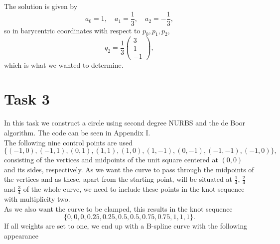 \documentclass[]{article}
\begin{document}
The solution is given by \begin{equation*}
a_0 = 1, \quad a_1 = \frac{1}{3}, \quad a_2 = -\frac{1}{3},
\end{equation*}
so in barycentric coordinates with respect to $p_0, p_1, p_2$, \begin{equation*}
q_2 = \frac{1}{3}\left(\begin{array}{r}
3\\
1\\
-1
\end{array}\right),
\end{equation*}
which is what we wanted to determine.

\section*{Task 3}
In this task we construct a circle using second degree NURBS and the de Boor algorithm. The code can be seen in Appendix I.\\
The following nine control points are used \begin{equation*}
\{(-1, 0), (-1, 1), (0, 1), (1, 1), (1, 0), (1, -1), (0, -1), (-1, -1), (-1, 0)\},
\end{equation*}
consisting of the vertices and midpoints of the unit square centered at $(0, 0)$ and its sides, respectively. As we want the curve to pass through the midpoints of the vertices and as these, apart from the starting point, will be situated at $\frac{1}{4}$, $\frac{2}{4}$ and $\frac{3}{4}$ of the whole curve, we need to include these points in the knot sequence with multiplicity two.\\
As we also want the curve to be clamped, this results in the knot sequence \begin{equation*}
\{0, 0, 0, 0.25, 0.25, 0.5, 0.5, 0.75, 0.75, 1, 1, 1\}.
\end{equation*}
If all weights are set to one, we end up with a B-spline curve with the following appearance
\end{document}
